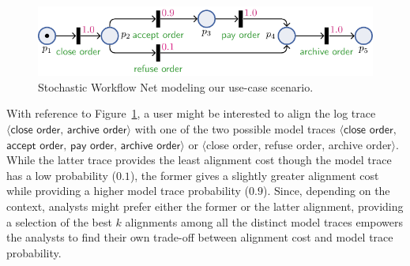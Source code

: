 \begin{figure}[!t]
	\centering
	\includegraphics[width=.6\textwidth]{images/petri_tut.pdf}
	\caption{Stochastic Workflow Net modeling our use-case scenario.}\label{fig:petri_tut}
\end{figure}
With reference to Figure~\ref{fig:petri_tut}, a user might be interested to align the log trace $\langle \textsf{close order},\,\textsf{archive order}\rangle$ with one of the two possible model traces $\langle\textsf{close order},$ $\textsf{accept order},\,\textsf{pay order},\,\textsf{archive order}\rangle$ or $\langle$\textsf{close order}, \textsf{refuse order}, \textsf{archive order}$\rangle$. While the latter trace provides the least alignment cost though the model trace has a low probability ($0.1$), the former gives a slightly greater alignment cost while providing a higher model trace probability ($0.9$). Since, depending on the context, analysts might prefer either the former or the latter alignment, providing a selection of the best $k$ alignments among all the distinct model traces empowers the analysts to find their own trade-off between alignment cost and model trace probability.



